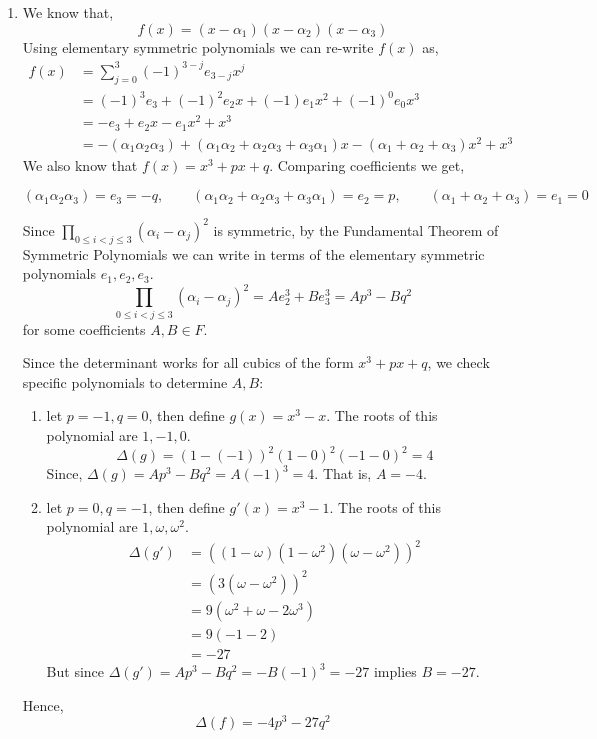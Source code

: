 \documentclass[12pt]{article}
\begin{document}
\begin{solution}
    \bbni
    \begin{enumerate}
        \item We know that, 
        \[f(x) = (x - \alpha_1)(x - \alpha_2)(x - \alpha_3)\]
       Using elementary symmetric polynomials we can re-write $f(x)$ as, 
       \begin{align*}
            f(x) &= \sum_{j=0}^{3}(-1)^{3-j}e_{3-j}x^j \\ 
            &= (-1)^3e_3 + (-1)^2e_2x + (-1)e_1x^2 + (-1)^0e_0x^3 \\ 
            &= -e_3 + e_2x - e_1x^2 + x^3 \\ 
            &= -(\alpha_1\alpha_2\alpha_3) + (\alpha_1\alpha_2 + \alpha_2\alpha_3 + \alpha_3\alpha_1)x - (\alpha_1 + \alpha_2 + \alpha_3)x^2 + x^3 
       \end{align*}
       We also know that $f(x) = x^3 +px + q$. Comparing coefficients we get, 

       \[(\alpha_1\alpha_2\alpha_3)  = e_3 = -q, \qquad  (\alpha_1\alpha_2 + \alpha_2\alpha_3 + \alpha_3\alpha_1) = e_2 = p, \qquad  (\alpha_1 + \alpha_2 + \alpha_3) = e_1= 0 \]

       Since $\prod_{0 \leq i < j \leq 3}(\alpha_i - \alpha_j)^2$ is symmetric, by the Fundamental Theorem of Symmetric Polynomials we can write in terms of the elementary symmetric polynomials $e_1, e_2, e_3$. 
       \[\prod_{0 \leq i < j \leq 3}(\alpha_i - \alpha_j)^2 = Ae_2^3 + Be_3^3 = Ap^3 - Bq^2\]
       for some coefficients $A, B \in F$.
       
       Since the determinant works for all cubics of the form $x^3 + px + q$, we check specific polynomials to determine $A, B$: 
       \begin{enumerate}
            \item let $p = -1, q=0$, then define $g(x) = x^3 - x$. The roots of this polynomial are $1, -1, 0$.
            \[\Delta(g) = (1 - (-1))^2(1-0)^2(-1-0)^2 = 4\]
            Since, $\Delta(g) = Ap^3 - Bq^2 = A(-1)^3 = 4$. That is, $A = -4$. 
            \item let $p = 0, q = -1$, then define $g'(x) = x^3 - 1$. The roots of this polynomial are $1, \omega, \omega^2$. 
            \begin{align*}
                \Delta(g') &= ((1 - \omega)(1-\omega^2)(\omega-\omega^2))^2 \\ 
                &= (3(\omega-\omega^2))^2 \\ 
                &= 9(\omega^2 + \omega - 2\omega^3) \\
                &= 9(-1 - 2) \\ 
                &= -27
            \end{align*}
            But since $\Delta(g') = Ap^3 - Bq^2 = -B(-1)^3 = -27$ implies $B = -27$. 
       \end{enumerate}
       Hence, 
       \[\Delta(f) = -4p^3  -27q^2\]
       

\end{enumerate}
\end{solution}
\end{document}
